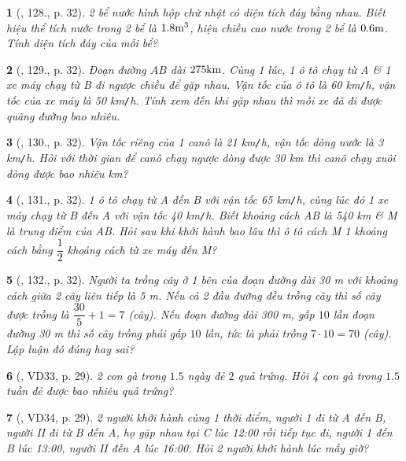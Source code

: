 \documentclass{article}
\newtheorem{baitoan}{}
\begin{document}
\begin{baitoan}[\cite{Tuyen_Toan_7}, 128., p. 32]
	2 bể nước hình hộp chữ nhật có diện tích đáy bằng nhau. Biết hiệu thể tích nước trong 2 bể là $\rm1.8m^3$, hiệu chiều cao nước trong 2 bể là $\rm0.6m$. Tính diện tích đáy của mỗi bể?
\end{baitoan}

\begin{baitoan}[\cite{Tuyen_Toan_7}, 129., p. 32]
	Đoạn đường $AB$ dài $\rm275km$. Cùng 1 lúc, 1 ô tô chạy từ A \& 1 xe máy chạy từ B đi ngược chiều để gặp nhau. Vận tốc của ô tô là {\rm60 km{\tt/}h}, vận tốc của xe máy là {\rm50 km{\tt/}h}. Tính xem đến khi gặp nhau thì mỗi xe đã đi được quãng đường bao nhiêu.
\end{baitoan}

\begin{baitoan}[\cite{Tuyen_Toan_7}, 130., p. 32]
	Vận tốc riêng của 1 canô là {\rm21 km{\tt/}h}, vận tốc dòng nước là {\rm3 km{\tt/}h}. Hỏi với thời gian để canô chạy ngược dòng được {\rm30 km} thì canô chạy xuôi dòng được bao nhiêu {\rm km}?
\end{baitoan}

\begin{baitoan}[\cite{Tuyen_Toan_7}, 131., p. 32]
	1 ô tô chạy từ A đến B với vận tốc {\rm65 km{\tt/}h}, cùng lúc đó 1 xe máy chạy từ B đến A với vận tốc {\rm40 km{\tt/}h}. Biết khoảng cách AB là {\rm540 km} \& M là trung điểm của AB. Hỏi sau khi khởi hành bao lâu thì ô tô cách M 1 khoảng cách bằng $\dfrac{1}{2}$ khoảng cách từ xe máy đến M?
\end{baitoan}

\begin{baitoan}[\cite{Tuyen_Toan_7}, 132., p. 32]
	Người ta trồng cây ở 1 bên của đoạn đường dài {\rm30 m} với khoảng cách giữa 2 cây liên tiếp là {\rm5 m}. Nếu cả 2 đầu đường đều trồng cây thì số cây được trồng là $\dfrac{30}{5} + 1 = 7$ (cây). Nếu đoạn đường dài {\rm300 m}, gấp $10$ lần đoạn đường {\rm30 m} thì số cây trồng phải gấp $10$ lần, tức là phải trồng $7\cdot 10 = 70$ (cây). Lập luận đó đúng hay sai?
\end{baitoan}

\begin{baitoan}[\cite{Binh_Toan_7_tap_1}, VD33, p. 29]
	2 con gà trong $1.5$ ngày đẻ $2$ quả trứng. Hỏi 4 con gà trong $1.5$ tuần đẻ được bao nhiêu quả trứng?
\end{baitoan}

\begin{baitoan}[\cite{Binh_Toan_7_tap_1}, VD34, p. 29]
	2 người khởi hành cùng 1 thời điểm, người 1 đi từ A đến B, người II đi từ B đến A, họ gặp nhau tại C lúc {\rm12:00} rồi tiếp tục đi, người 1 đến B lúc {\rm13:00}, người II đến A lúc {\rm16:00}. Hỏi 2 người khởi hành lúc mấy giờ?
\end{baitoan}
\end{document}
